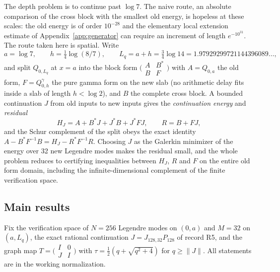 \documentclass[11pt]{article}
\numberwithin{equation}{section}
\theoremstyle{definition}
\theoremstyle{remark}
\newcommand{\norm}[1]{\lVert#1\rVert}
\newcommand{\Lq}{L_q}
\begin{document}
The depth problem is to continue past $\log7$. The naive route, an absolute comparison of the cross block with the smallest old energy, is hopeless at these scales: the old energy is of order $10^{-28}$ and the elementary local extension estimate of Appendix~\ref{app:generator} can require an increment of length $e^{-10^{31}}$. The route taken here is spatial. Write
\begin{equation}\label{eq:depth}
 a=\log7,\qquad h=\tfrac14\log(8/7),\qquad \Lq=a+h=\tfrac34\log14=1.97929299721144396089\ldots,
\end{equation}
and split $Q_{0,\Lq}$ at $x=a$ into the block form $\bigl(\begin{smallmatrix}A&B^*\\B&F\end{smallmatrix}\bigr)$ with $A=Q_{0,a}$ the old form, $F=Q^\gamma_{0,h}$ the pure gamma form on the new slab (no arithmetic delay fits inside a slab of length $h<\log2$), and $B$ the complete cross block. A bounded continuation $J$ from old inputs to new inputs gives the \emph{continuation energy} and \emph{residual}
\begin{equation}\label{eq:HR}
 H_J=A+B^*J+J^*B+J^*FJ,\qquad R=B+FJ,
\end{equation}
and the Schur complement of the split obeys the exact identity $A-B^*F^{-1}B=H_J-R^*F^{-1}R$. Choosing $J$ as the Galerkin minimizer of the energy over 32 new Legendre modes makes the residual small, and the whole problem reduces to certifying inequalities between $H_J$, $R$ and $F$ on the entire old form domain, including the infinite-dimensional complement of the finite verification space.

\subsection{Main results}
Fix the verification space of $N=256$ Legendre modes on $(0,a)$ and $M=32$ on $(a,\Lq)$, the exact rational continuation $J=J_{128,32}P_{128}$ of record R5, and the graph map $T=\bigl(\begin{smallmatrix}I&0\\J&I\end{smallmatrix}\bigr)$ with $\tau=\tfrac12(q+\sqrt{q^2+4})$ for $q\ge\norm J$. All statements are in the working normalization.
\end{document}
